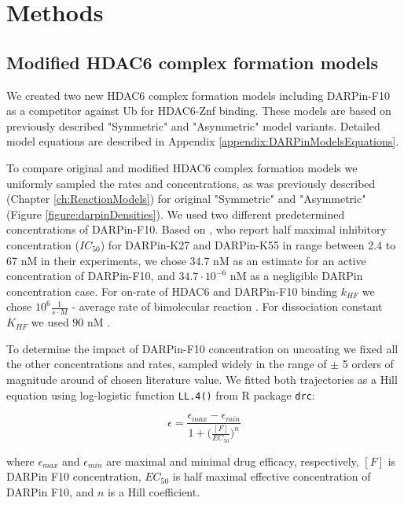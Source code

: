 \section{Methods}

\subsection{Modified HDAC6 complex formation models}

We created two new HDAC6 complex formation models including DARPin-F10 as a competitor against Ub for HDAC6-Znf binding. These models are based on previously described "Symmetric" and "Asymmetric" model variants. Detailed model equations are described in Appendix \ref{appendix:DARPinModelsEquations}.

To compare original and modified HDAC6 complex formation models we uniformly sampled the rates and concentrations, as was previously described (Chapter \ref{ch:ReactionModels}) for original "Symmetric" and "Asymmetric" (Figure \ref{figure:darpinDensities}). We used two different predetermined concentrations of DARPin-F10. Based on \cite{guillard2017structural}, who report half maximal inhibitory concentration ($IC_{50}$) for DARPin-K27 and DARPin-K55 in range between 2.4 to 67 nM in their experiments, we chose $34.7$ nM as an estimate for an active concentration of DARPin-F10, and  $34.7 \cdot 10^{-6}$ nM as a negligible DARPin concentration case. For on-rate of HDAC6 and DARPin-F10 binding $k_{HF}$ we chose $10^{6} \frac{1}{s\cdot M}$ - average rate of bimolecular reaction \cite{bionumbersbimolrate}. For dissociation constant $K_{HF}$ we used $90$ nM \cite{DarpinData}.

To determine the impact of DARPin-F10 concentration on uncoating we fixed all the other concentrations and rates, sampled widely in the range of $\pm$ 5 orders of magnitude around of chosen literature value. We fitted both trajectories as a Hill equation using log-logistic function \texttt{LL.4()} from R package \texttt{drc}:

\begin{equation}
\epsilon=\frac{\epsilon_{max} - \epsilon_{min}}{1 + \big(\frac{[F]}{EC_{50}}\big)^n}
\end{equation}

where $\epsilon_{max}$ and $\epsilon_{min}$ are maximal and minimal drug efficacy, respectively, $[F]$ is DARPin F10 concentration, $EC_{50}$ is half maximal effective concentration of DARPin F10, and $n$ is a Hill coefficient.

